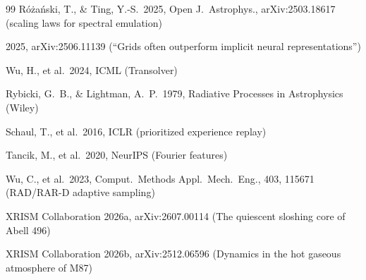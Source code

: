 \documentclass[11pt,a4paper]{article}
\begin{document}
\begin{thebibliography}{99}
R{\'o}{\.z}a{\'n}ski, T., \& Ting, Y.-S.\ 2025, Open J.~Astrophys.,
arXiv:2503.18617 (scaling laws for spectral emulation)

2025, arXiv:2506.11139 (``Grids often outperform implicit neural
representations'')

Wu, H., et al.\ 2024, ICML (Transolver)

Rybicki, G.~B., \& Lightman, A.~P.\ 1979, Radiative Processes in
Astrophysics (Wiley)

Schaul, T., et al.\ 2016, ICLR (prioritized experience replay)

Tancik, M., et al.\ 2020, NeurIPS (Fourier features)

Wu, C., et al.\ 2023, Comput.~Methods Appl.~Mech.~Eng., 403, 115671
(RAD/RAR-D adaptive sampling)

XRISM Collaboration 2026a, arXiv:2607.00114 (The quiescent sloshing core
of Abell 496)

XRISM Collaboration 2026b, arXiv:2512.06596 (Dynamics in the hot
gaseous atmosphere of M87)

\end{thebibliography}
\end{document}
